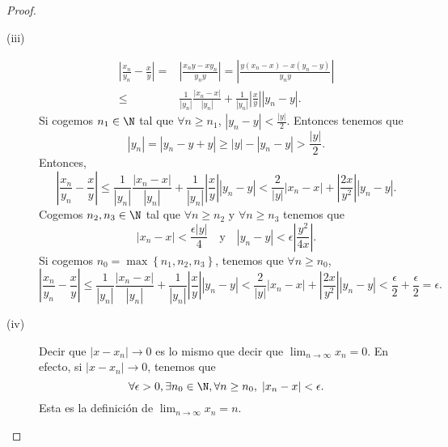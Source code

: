 \begin{proof}
\begin{description}
\item[(iii)] 
\[
\begin{split}
	\left|\frac{x_{n}}{y_{n}} - \frac{x}{y}\right|  = & \left| \frac{x_{n}y-xy_{n}}{y_{n}y}\right| = \left|\frac{y \left(x_{n}-x\right) - x \left(y_{n}-y\right)}{y_{n}y}\right|\\
	\leq & \frac{1}{ \left|y_{n}\right|} \frac{ \left|x_{n}-x\right|}{|y_{n}|} + \frac{1}{ \left|y_{n}\right|} \left|\frac{x}{y}\right| \left|y_{n}-y\right|.
\end{split}
\]
Si cogemos $\displaystyle n_{1} \in \N $ tal que $\displaystyle \forall n\geq n_{1} $, $\displaystyle \left|y_{n}-y\right| < \frac{ \left|y\right|}{2} $. Entonces tenemos que
\[ \left|y_{n}\right| = \left|y_{n}-y+y\right| \geq \left|y\right| - \left|y_{n}-y\right|> \frac{ \left|y\right|}{2} .\]
Entonces, 
\[ \left|\frac{x_{n}}{y_{n}} - \frac{x}{y}\right| \leq \frac{1}{ \left|y_{n}\right|} \frac{ \left|x_{n}-x\right|}{|y_{n}|} + \frac{1}{ \left|y_{n}\right|} \left|\frac{x}{y}\right| \left|y_{n}-y\right| < \frac{2}{ \left|y\right|} \left|x_{n}-x\right| + \left|\frac{2x}{y^{2}}\right| \left|y_{n}-y\right|.\]
Cogemos $\displaystyle n_{2}, n_{3}\in\N $ tal que $\displaystyle \forall n\geq n_{2} $ y $\displaystyle \forall n\geq n_{3} $ tenemos que 
\[ \left|x_{n}-x\right| < \frac{\epsilon \left|y\right|}{4} \quad \text{y} \quad \left|y_{n}-y\right| < \epsilon \left|\frac{y^{2}}{4x}\right| .\]
Si cogemos $\displaystyle n_{0} = \max \left\{ n_{1}, n_{2}, n_{3}\right\}  $, tenemos que $\displaystyle \forall n\geq n_{0} $, 
\[\left|\frac{x_{n}}{y_{n}} - \frac{x}{y}\right| \leq \frac{1}{ \left|y_{n}\right|} \frac{ \left|x_{n}-x\right|}{|y_{n}|} + \frac{1}{ \left|y_{n}\right|} \left|\frac{x}{y}\right| \left|y_{n}-y\right| < \frac{2}{ \left|y\right|} \left|x_{n}-x\right| + \left|\frac{2x}{y^{2}}\right| \left|y_{n}-y\right|<\frac{\epsilon }{2} + \frac{\epsilon }{2} = \epsilon .\]

\item[(iv)] Decir que $\displaystyle \left|x -x_{n}\right|\to 0 $ es lo mismo que decir que $\displaystyle \lim_{n \to \infty}x_{n} = 0 $. En efecto, si $\displaystyle \left|x -x_{n}\right|\to 0 $, tenemos que
\[\forall \epsilon > 0, \exists n_{0}\in\N, \forall n \geq n_{0}, \; \left|x_{n}-x\right|<\epsilon  .\]
Esta es la definición de $\displaystyle \lim_{n \to \infty}x_{n}=n $.

\end{description}
\end{proof}

